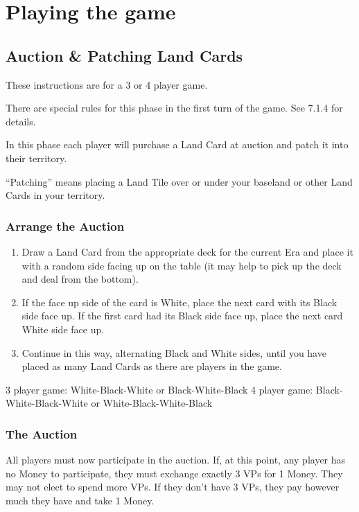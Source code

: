 \documentclass[10pt,twocolumn]{article}
\begin{document}
\section{Playing the game}
\subsection{Auction \& Patching Land Cards}
These instructions are for a 3 or 4 player game.

There are special rules for this phase in the first turn of the game. See 7.1.4 for details.

In this phase each player will purchase a Land Card at auction and patch it into their territory.

``Patching'' means placing a Land Tile over or under your baseland or other Land Cards in your territory.

\subsubsection{Arrange the Auction}
\begin{enumerate}
\item Draw a Land Card from the appropriate deck for the current Era and place it with a random side facing up on the table (it may help to pick up the deck and deal from the bottom).
\item If the face up side of the card is White, place the next card with its Black side face up. If the first card had its Black side face up, place the next card White side face up.
\item Continue in this way, alternating Black and White sides, until you have placed as many Land Cards as there are players in the game.
\end{enumerate}
\begin{BoxExample}3 player game: White-Black-White or Black-White-Black
4 player game: Black-White-Black-White or White-Black-White-Black\end{BoxExample}


\subsubsection{The Auction}
All players must now participate in the auction. If, at this point, any player has no Money to participate, they must exchange exactly 3 VPs for 1 Money. They may not elect to spend more VPs. If they don't have 3 VPs, they pay however much they have and take 1 Money.
\end{document}
